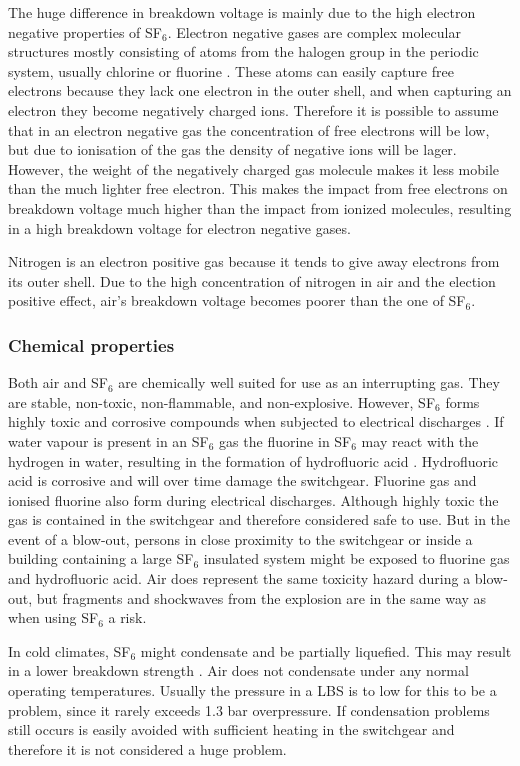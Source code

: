 \documentclass[10pt,a4paper,twoside]{article}
\begin{document}
The huge difference in breakdown voltage is mainly due to the high electron negative properties of SF$_6$. Electron negative gases are complex molecular structures mostly consisting of atoms from the halogen group in the periodic system, usually chlorine or fluorine \cite{bib:TET4160HVIM}. These atoms can easily capture free electrons because they lack one electron in the outer shell, and when capturing an electron they become negatively charged ions. Therefore it is possible to assume that in an electron negative gas the concentration of free electrons will be low, but due to ionisation of the gas the density of negative ions will be lager. However, the weight of the negatively charged gas molecule makes it less mobile than the much lighter free electron. This makes the impact from free electrons on breakdown voltage much higher than the impact from ionized molecules, resulting in a high breakdown voltage for electron negative gases.

Nitrogen is an electron positive gas because it tends to give away electrons from its outer shell. Due to the high concentration of nitrogen in air and the election positive effect, air's breakdown voltage becomes poorer than the one of SF$_6$.

\subsubsection*{Chemical properties}
Both air and SF$_6$ are chemically well suited for use as an interrupting gas. They are stable, non-toxic, non-flammable, and non-explosive. However, SF$_6$ forms highly toxic and corrosive compounds when subjected to electrical discharges \cite{bib:SF6PI}. If water vapour is present in an SF$_6$ gas the fluorine in SF$_6$ may react with the hydrogen in water, resulting in the formation of hydrofluoric acid \cite{bib:SF6PI}. Hydrofluoric acid is corrosive and will over time damage the switchgear. Fluorine gas and ionised fluorine also form during electrical discharges. Although highly toxic the gas is contained in the switchgear and therefore considered safe to use. But in the event of a blow-out, persons in close proximity to the switchgear or inside a building containing a large SF$_6$ insulated system might be exposed to fluorine gas and hydrofluoric acid. Air does represent the same toxicity hazard during a blow-out, but fragments and shockwaves from the explosion are in the same way as when using SF$_6$ a risk.

In cold climates, SF$_6$ might condensate and be partially liquefied. This may result in a lower breakdown strength \cite{bib:SF6PI}. Air does not condensate under any normal operating temperatures. Usually the pressure in a LBS is to low for this to be a problem, since it rarely exceeds 1.3 bar overpressure. If condensation problems still occurs is easily avoided with sufficient heating in the switchgear and therefore it is not considered a huge problem.
\end{document}
